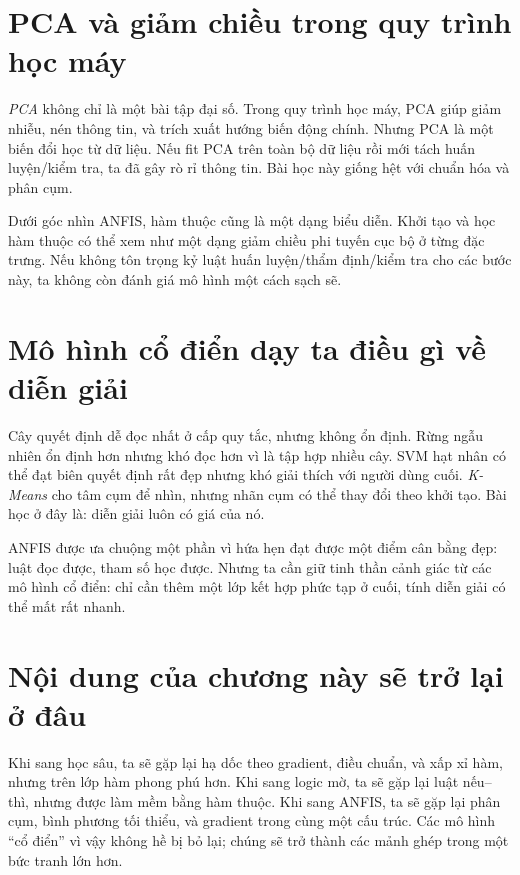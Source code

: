 \section{PCA và giảm chiều trong quy trình học máy}

\emph{PCA} không chỉ là một bài tập đại số. Trong quy trình học máy, PCA giúp giảm nhiễu, nén thông tin, và trích xuất hướng biến động chính. Nhưng PCA là một biến đổi học từ dữ liệu. Nếu fit PCA trên toàn bộ dữ liệu rồi mới tách huấn luyện/kiểm tra, ta đã gây rò rỉ thông tin. Bài học này giống hệt với chuẩn hóa và phân cụm.

Dưới góc nhìn ANFIS, hàm thuộc cũng là một dạng biểu diễn. Khởi tạo và học hàm thuộc có thể xem như một dạng giảm chiều phi tuyến cục bộ ở từng đặc trưng. Nếu không tôn trọng kỷ luật huấn luyện/thẩm định/kiểm tra cho các bước này, ta không còn đánh giá mô hình một cách sạch sẽ.

\section{Mô hình cổ điển dạy ta điều gì về diễn giải}

Cây quyết định dễ đọc nhất ở cấp quy tắc, nhưng không ổn định. Rừng ngẫu nhiên ổn định hơn nhưng khó đọc hơn vì là tập hợp nhiều cây. SVM hạt nhân có thể đạt biên quyết định rất đẹp nhưng khó giải thích với người dùng cuối. \emph{K-Means} cho tâm cụm để nhìn, nhưng nhãn cụm có thể thay đổi theo khởi tạo. Bài học ở đây là: diễn giải luôn có giá của nó.

ANFIS được ưa chuộng một phần vì hứa hẹn đạt được một điểm cân bằng đẹp: luật đọc được, tham số học được. Nhưng ta cần giữ tinh thần cảnh giác từ các mô hình cổ điển: chỉ cần thêm một lớp kết hợp phức tạp ở cuối, tính diễn giải có thể mất rất nhanh.

\section{Nội dung của chương này sẽ trở lại ở đâu}

Khi sang học sâu, ta sẽ gặp lại hạ dốc theo gradient, điều chuẩn, và xấp xỉ hàm, nhưng trên lớp hàm phong phú hơn. Khi sang logic mờ, ta sẽ gặp lại luật nếu--thì, nhưng được làm mềm bằng hàm thuộc. Khi sang ANFIS, ta sẽ gặp lại phân cụm, bình phương tối thiểu, và gradient trong cùng một cấu trúc. Các mô hình ``cổ điển'' vì vậy không hề bị bỏ lại; chúng sẽ trở thành các mảnh ghép trong một bức tranh lớn hơn.
